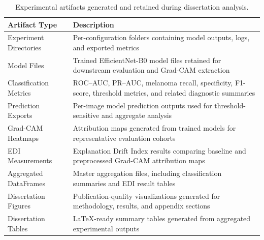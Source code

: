 \begin{table}[H]
\centering
\caption{Experimental artifacts generated and retained during dissertation analysis.}
\label{tab:experimental_artifacts}

\small
\renewcommand{\arraystretch}{1.25}

\begin{tabular}{p{3.8cm}p{8.2cm}}
\toprule
\textbf{Artifact Type} & \textbf{Description} \\
\midrule

Experiment Directories & Per-configuration folders containing model outputs, logs, and exported metrics \\

Model Files & Trained EfficientNet-B0 model files retained for downstream evaluation and Grad-CAM extraction \\

Classification Metrics & ROC--AUC, PR--AUC, melanoma recall, specificity, F1-score, threshold metrics, and related diagnostic summaries \\

Prediction Exports & Per-image model prediction outputs used for threshold-sensitive and aggregate analysis \\

Grad-CAM Heatmaps & Attribution maps generated from trained models for representative evaluation cohorts \\

EDI Measurements & Explanation Drift Index results comparing baseline and preprocessed Grad-CAM attribution maps \\

Aggregated DataFrames & Master aggregation files, including classification summaries and EDI result tables \\

Dissertation Figures & Publication-quality visualizations generated for methodology, results, and appendix sections \\

Dissertation Tables & LaTeX-ready summary tables generated from aggregated experimental outputs \\

\bottomrule
\end{tabular}
\end{table}
